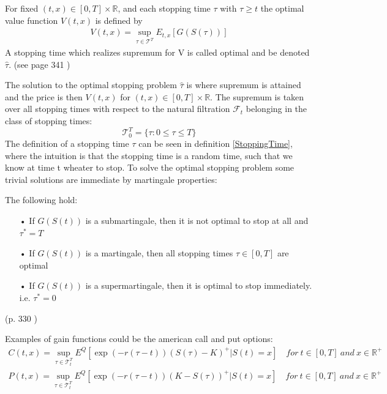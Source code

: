 \theoremstyle{definition}
\begin{definition}{}\label{optValFunc}
For fixed $(t,x)\in [0,T] \times \mathbb{R}$, and each stopping time $\tau$ with $\tau\geq t$ the optimal value function $V(t,x)$ is defined by
\begin{align}
V(t,x)= \sup_{\tau \in \mathcal{T}^T} E_{t,x}[G(S(\tau))]
\end{align}
A stopping time which realizes supremum for V is called optimal and be denoted $\hat{\tau}$.
(see page 341 \parencite{finKont})
\end{definition}

The solution to the optimal stopping problem $\hat{\tau}$ is where supremum is attained and the price is then $V(t,x)$ for $(t,x)\in [0,T] \times \mathbb{R}$. The supremum is taken over all stopping times with respect to the natural filtration $\mathcal{F}_{t}$ belonging in the class of stopping times:
$$\mathcal{T}_0^T=\{\tau : 0 \leq \tau \leq T \}$$
The definition of a stopping time $\tau$ can be seen in definition \ref{StoppingTime}, where the intuition is that the stopping time is a random time, such that we know at time t wheater to stop. To solve the optimal stopping problem some trivial solutions are immediate by martingale properties:
\begin{proposition}\label{TrivialMG}
The following hold:
\begin{enumerate}
\item[•] If $G(S(t))$ is a submartingale, then it is not optimal to stop at all and $\tau^*=T$
\item[•] If $G(S(t))$ is a martingale, then all stopping times $\tau\in [0,T]$ are optimal
\item[•] If $G(S(t))$ is a supermartingale, then it is optimal to stop immediately. i.e. $\tau^*=0$
\end{enumerate}
(p. 330 \parencite{finKont})
\end{proposition}

Examples of gain functions could be the american call and put options:
\begin{align}
C(t,x)=\sup_{\tau \in \mathcal{T}_t^T} E^Q[\exp(-r(\tau-t)) (S(\tau)-K)^+|S(t)=x] \quad for \ t\in [0,T] \ and \ x\in\mathbb{R}^+\\
P(t,x)=\sup_{\tau \in \mathcal{T}_t^T} E^Q[\exp(-r(\tau-t)) (K-S(\tau))^+|S(t)=x] \quad for \ t\in [0,T] \ and \ x\in\mathbb{R}^+
\end{align}


